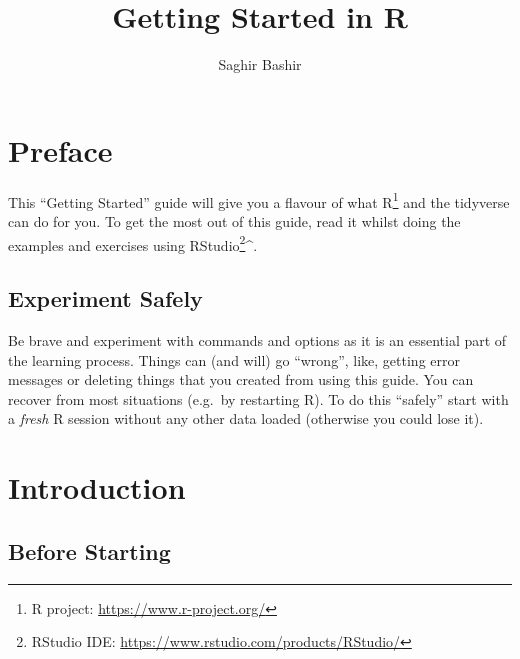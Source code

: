 \documentclass[a4paper,9pt,twocolumn,twoside,printwatermark=false]{pinp}
\title{Getting Started in R}
\author[]{Saghir Bashir}
\begin{document}
\verticaladjustment{-2pt}

\maketitle
\thispagestyle{firststyle}



\section{Preface}\label{preface}

This ``Getting Started'' guide will give you a flavour of what
R\footnote{R project: \url{https://www.r-project.org/}} and the
tidyverse can do for you. To get the most out of this guide, read it
whilst doing the examples and exercises using RStudio\footnote{RStudio
  IDE: \url{https://www.rstudio.com/products/RStudio/}}\^{}.

\subsection{Experiment Safely}\label{experiment-safely}

Be brave and experiment with commands and options as it is an essential
part of the learning process. Things can (and will) go ``wrong'', like,
getting error messages or deleting things that you created from using
this guide. You can recover from most situations (e.g.~by restarting R).
To do this ``safely'' start with a \emph{fresh} R session without any
other data loaded (otherwise you could lose it).

\section{Introduction}\label{introduction}

\subsection{Before Starting}\label{before-starting}
\end{document}
